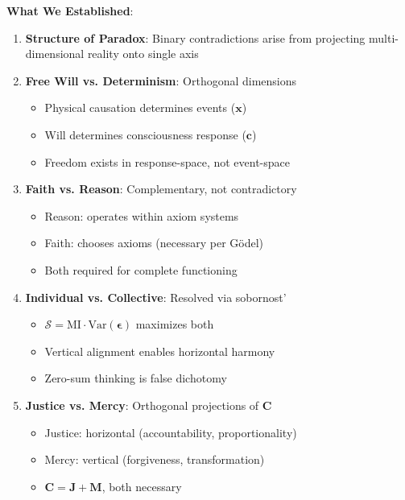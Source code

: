 \documentclass[11pt,a4paper]{article}
\theoremstyle{definition}
\theoremstyle{remark}
\newcommand{\cc}{\mathbf{c}}
\begin{document}
\begin{enumerate}
\begin{mdframed}[backgroundcolor=green!10,linewidth=2pt,linecolor=green!70!black]
\textbf{What We Established}:
\begin{enumerate}[nosep]
    \item \textbf{Structure of Paradox}: Binary contradictions arise from projecting multi-dimensional reality onto single axis
    \item \textbf{Free Will vs. Determinism}: Orthogonal dimensions
        \begin{itemize}[nosep]
            \item Physical causation determines events (\(\mathbf{x}\))
            \item Will determines consciousness response (\(\cc\))
            \item Freedom exists in response-space, not event-space
        \end{itemize}
    \item \textbf{Faith vs. Reason}: Complementary, not contradictory
        \begin{itemize}[nosep]
            \item Reason: operates within axiom systems
            \item Faith: chooses axioms (necessary per Gödel)
            \item Both required for complete functioning
        \end{itemize}
    \item \textbf{Individual vs. Collective}: Resolved via sobornost'
        \begin{itemize}[nosep]
            \item \(\mathcal{S} = \text{MI} \cdot \text{Var}(\boldsymbol{\epsilon})\) maximizes both
            \item Vertical alignment enables horizontal harmony
            \item Zero-sum thinking is false dichotomy
        \end{itemize}
    \item \textbf{Justice vs. Mercy}: Orthogonal projections of \(\mathbf{C}\)
        \begin{itemize}[nosep]
            \item Justice: horizontal (accountability, proportionality)
            \item Mercy: vertical (forgiveness, transformation)
            \item \(\mathbf{C} = \mathbf{J} + \mathbf{M}\), both necessary
        \end{itemize}
\end{enumerate}


\end{mdframed}
\end{enumerate}
\end{document}
